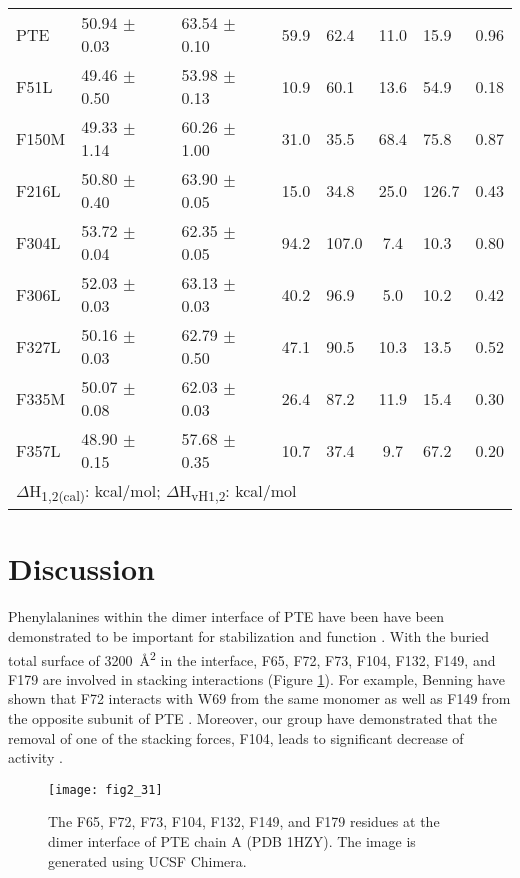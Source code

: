 \begin{refsection}
\begin{table}[htbp]
\begin{tabular}{lllclclc}
    PTE & 50.94 $\pm$ 0.03  & 63.54 $\pm$ 0.10 & 59.9 & 62.4 & 11.0 & 15.9 & 0.96\\
    F51L & 49.46 $\pm$ 0.50 & 53.98 $\pm$ 0.13 & 10.9 & 60.1 & 13.6 & 54.9 & 0.18\\
    F150M & 49.33 $\pm$ 1.14 & 60.26 $\pm$ 1.00 & 31.0 & 35.5 & 68.4 & 75.8 & 0.87\\
    F216L & 50.80 $\pm$ 0.40 & 63.90 $\pm$ 0.05 & 15.0 & 34.8 & 25.0 & 126.7 & 0.43\\
    F304L & 53.72 $\pm$ 0.04 & 62.35 $\pm$ 0.05 & 94.2 & 107.0 & 7.4 & 10.3 & 0.80\\
    F306L & 52.03 $\pm$ 0.03 & 63.13 $\pm$ 0.03 & 40.2 & 96.9 & 5.0 & 10.2 & 0.42\\
    F327L & 50.16 $\pm$ 0.03 & 62.79 $\pm$ 0.50 & 47.1 & 90.5 & 10.3 & 13.5 & 0.52\\
    F335M & 50.07 $\pm$ 0.08 & 62.03 $\pm$ 0.03 & 26.4 & 87.2 & 11.9 & 15.4 & 0.30\\
    F357L & 48.90 $\pm$ 0.15 & 57.68 $\pm$ 0.35 & 10.7 & 37.4 & 9.7 & 67.2 & 0.20\\

    \hline
    \multicolumn{8}{l}{$\Delta$H\textsubscript{1,2(cal)}: kcal/mol;
    $\Delta$H\textsubscript{vH1,2}: kcal/mol}
    \end{tabular}
    \label{tab:dsc-chap2-result}
\end{table}

\section{Discussion}

Phenylalanines within the dimer interface of PTE have been have been
demonstrated to be important for stabilization and function \cite{Yang2014a,
Baker2011b,Toone2009}. With the buried total surface of
\SI{3200}{\angstrom^{2}} in the interface, F65, F72, F73, F104, F132, F149, and
F179 are involved in stacking interactions \cite{Toone2009} (Figure
\ref{fig:interface}). For example, Benning  have shown that F72
interacts with W69 from the same monomer as well as F149 from the opposite
subunit of PTE \cite{Benning2001a}.  Moreover, our group have demonstrated that
the removal of one of the stacking forces, F104, leads to significant decrease
of activity \cite{Yang2014a}.
\begin{figure}[htbp] \centering \texttt{[image: fig2\_31]}
    \caption[The F65, F72, F73, F104, F132, F149, and F179 residues at the
    dimer interface of chain A of PTE (PDB 1HZY). The image is generated using
UCSF Chimera.]{The F65, F72, F73, F104, F132, F149, and F179 residues at the
dimer interface of PTE chain A (PDB 1HZY). The image is generated using UCSF
Chimera.}
    \label{fig:interface}
\end{figure}


\end{refsection}
